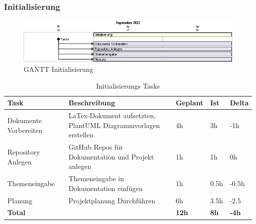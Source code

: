   \subsubsection{Initialisierung}
  \begin{figure}[H]
    \begin{center}
      \includegraphics[width=1\linewidth]{../content/diagrams/gantt/InitializationPlanning/initializationPlanning.png}
      \caption{GANTT Initialisierung}
    \end{center}
  \end{figure}
  \begin{table}[H]
    \centering
    \settowidth{}
    \setlength\extrarowheight{2pt}
    \begin{tabulary}{1.0\textwidth}{|L|L|L|L|L|}
      \hline
      \textbf{Task} &
      \textbf{Beschreibung} &
      \textbf{Geplant}&
      \textbf{Ist}&
      \textbf{Delta}\\
      \hline
      Dokumente Vorbereiten &
      LaTex-Dokument aufsetzten, PlantUML Diagrammvorlagen erstellen &
      4h &
      3h&
      -1h\\
      \hline
      Repository Anlegen &
      GitHub Repos für Dokumentation und Projekt anlegen &
      1h &
      1h&
      0h\\
      \hline
      Themeneingabe &
      Themeneingabe in Dokumentation einfügen &
      1h &
      0.5h&
      -0.5h\\
      \hline
      Planung &
      Projektplanung Durchführen &
      6h &
      3.5h&
      -2.5\\
      \hline
      \textbf{Total} &
       &
      \textbf{12h} &
      \textbf{8h}&
      \textbf{-4h}\\
      \hline 
    \end{tabulary} 
    \caption{Initialisierungs Tasks}
  \end{table}

